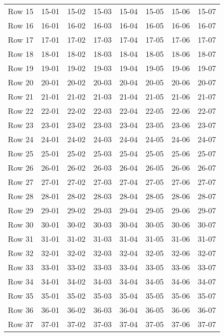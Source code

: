 \documentclass[report,oneside,UTF8,zihao=-4]{config}
\begin{document}
\begin{longtable}{cccccccc}
        Row 15 & 15-01 & 15-02 & 15-03 & 15-04 & 15-05 & 15-06 & 15-07 \\
        Row 16 & 16-01 & 16-02 & 16-03 & 16-04 & 16-05 & 16-06 & 16-07 \\
        Row 17 & 17-01 & 17-02 & 17-03 & 17-04 & 17-05 & 17-06 & 17-07 \\
        Row 18 & 18-01 & 18-02 & 18-03 & 18-04 & 18-05 & 18-06 & 18-07 \\
        Row 19 & 19-01 & 19-02 & 19-03 & 19-04 & 19-05 & 19-06 & 19-07 \\
        Row 20 & 20-01 & 20-02 & 20-03 & 20-04 & 20-05 & 20-06 & 20-07 \\
        Row 21 & 21-01 & 21-02 & 21-03 & 21-04 & 21-05 & 21-06 & 21-07 \\
        Row 22 & 22-01 & 22-02 & 22-03 & 22-04 & 22-05 & 22-06 & 22-07 \\
        Row 23 & 23-01 & 23-02 & 23-03 & 23-04 & 23-05 & 23-06 & 23-07 \\
        Row 24 & 24-01 & 24-02 & 24-03 & 24-04 & 24-05 & 24-06 & 24-07 \\
        Row 25 & 25-01 & 25-02 & 25-03 & 25-04 & 25-05 & 25-06 & 25-07 \\
        Row 26 & 26-01 & 26-02 & 26-03 & 26-04 & 26-05 & 26-06 & 26-07 \\
        Row 27 & 27-01 & 27-02 & 27-03 & 27-04 & 27-05 & 27-06 & 27-07 \\
        Row 28 & 28-01 & 28-02 & 28-03 & 28-04 & 28-05 & 28-06 & 28-07 \\
        Row 29 & 29-01 & 29-02 & 29-03 & 29-04 & 29-05 & 29-06 & 29-07 \\
        Row 30 & 30-01 & 30-02 & 30-03 & 30-04 & 30-05 & 30-06 & 30-07 \\
        Row 31 & 31-01 & 31-02 & 31-03 & 31-04 & 31-05 & 31-06 & 31-07 \\
        Row 32 & 32-01 & 32-02 & 32-03 & 32-04 & 32-05 & 32-06 & 32-07 \\
        Row 33 & 33-01 & 33-02 & 33-03 & 33-04 & 33-05 & 33-06 & 33-07 \\
        Row 34 & 34-01 & 34-02 & 34-03 & 34-04 & 34-05 & 34-06 & 34-07 \\
        Row 35 & 35-01 & 35-02 & 35-03 & 35-04 & 35-05 & 35-06 & 35-07 \\
        Row 36 & 36-01 & 36-02 & 36-03 & 36-04 & 36-05 & 36-06 & 36-07 \\
        Row 37 & 37-01 & 37-02 & 37-03 & 37-04 & 37-05 & 37-06 & 37-07 \\

\end{longtable}
\end{document}
